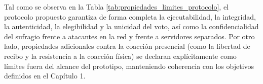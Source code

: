 Tal como se observa en la Tabla \ref{tab:propiedades_limites_protocolo}, el protocolo propuesto garantiza de forma completa la ejecutabilidad, la integridad, la autenticidad, la elegibilidad y la unicidad del voto, así como la confidencialidad del sufragio frente a atacantes en la red y frente a servidores separados. Por otro lado, propiedades adicionales contra la coacción presencial (como la libertad de recibo y la resistencia a la coacción física) se declaran explícitamente como límites fuera del alcance del prototipo, manteniendo coherencia con los objetivos definidos en el Capítulo 1.
